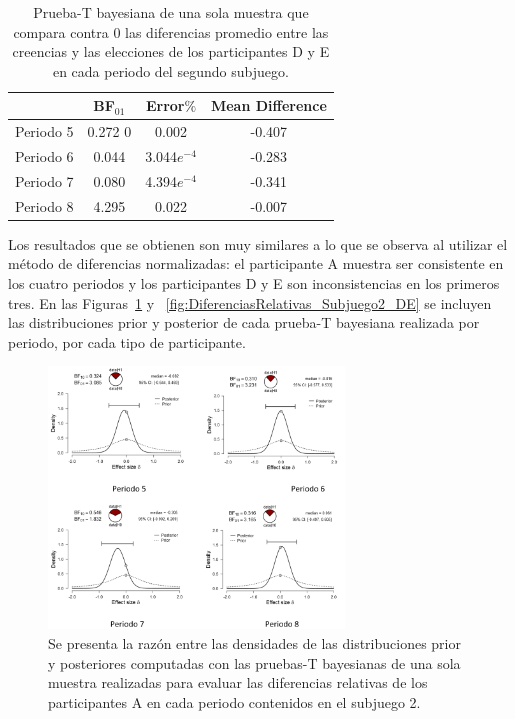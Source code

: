 \begin{table}
\caption[Diferencias Relativas en el Subjuego 2, (Participantes D y E)]{Prueba-T bayesiana de una sola muestra que compara contra 0 las diferencias promedio entre las creencias y las elecciones de los participantes D y E en cada periodo del segundo subjuego.}
\label{DR_Sub2_DE}
\centering
\begin{tabular}{l | c c c}  %
\toprule
\textbf{} & \textbf{BF$_{01}$} & \textbf{Error$\%$} & \textbf{Mean Difference}\\
\midrule
Periodo 5 & 0.272 0& 0.002 & -0.407 \\
Periodo 6 & 0.044 & 3.044$e^{-4}$ & -0.283 \\
Periodo 7 & 0.080 & 4.394$e^{-4}$ & -0.341 \\
Periodo 8 & 4.295 & 0.022 & -0.007 \\
\bottomrule
\end{tabular}
\end{table}

Los resultados que se obtienen son muy similares a lo que se observa al utilizar el método de diferencias normalizadas: el participante A muestra ser consistente en los cuatro periodos y los participantes D y E son inconsistencias en los primeros tres. En las Figuras~\ref{fig:DiferenciasRelativas_Subjuego2_A} y ~\ref{fig:DiferenciasRelativas_Subjuego2_DE} se incluyen las distribuciones prior y posterior de cada prueba-T bayesiana realizada por periodo, por cada tipo de participante.\\

\begin{figure}[th]
\centering
\includegraphics[width=0.70\textwidth]{Figures/Fig_13} 
\caption[Cambio en el número elegido periodo a periodo.]{Se presenta la razón entre las densidades de las distribuciones prior y posteriores  computadas con las pruebas-T bayesianas de una sola muestra realizadas para evaluar las diferencias relativas de los participantes A en cada periodo contenidos en el subjuego 2.}
\label{fig:DiferenciasRelativas_Subjuego2_A}
\end{figure}

